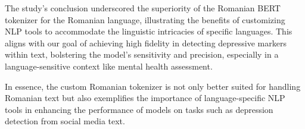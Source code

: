 The study's conclusion \cite{dumitrescu2020birth} underscored the superiority of the Romanian BERT tokenizer for the Romanian language, illustrating the benefits of customizing NLP tools to accommodate the linguistic intricacies of specific languages. This aligns with our goal of achieving high fidelity in detecting depressive markers within text, bolstering the model's sensitivity and precision, especially in a language-sensitive context like mental health assessment.

In essence, the custom Romanian tokenizer is not only better suited for handling Romanian text but also exemplifies the importance of language-specific NLP tools in enhancing the performance of models on tasks such as depression detection from social media text.